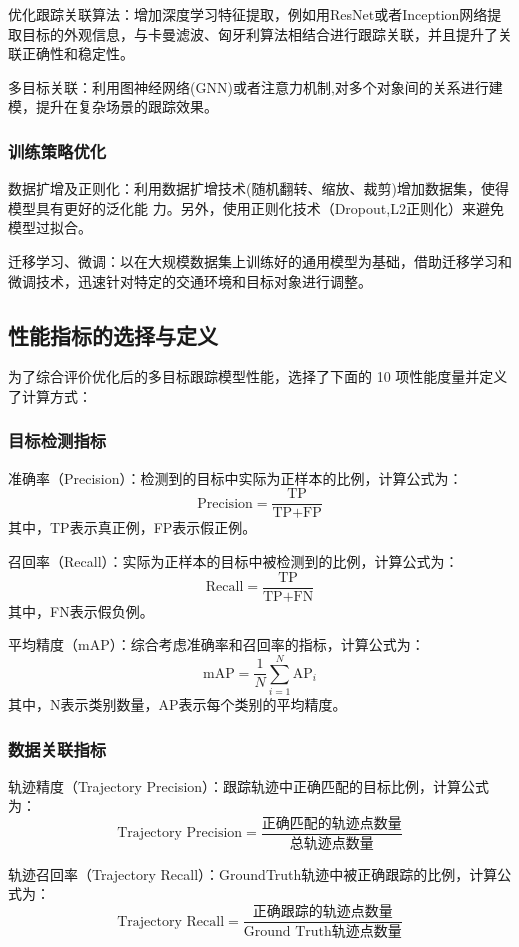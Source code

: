 优化跟踪关联算法：增加深度学习特征提取，例如用ResNet或者Inception网络提取目标的外观信息，与卡曼滤波、匈牙利算法相结合进行跟踪关联，并且提升了关联正确性和稳定性。

多目标关联：利用图神经网络(GNN)或者注意力机制,对多个对象间的关系进行建模，提升在复杂场景的跟踪效果。

\subsubsection{训练策略优化}

数据扩增及正则化：利用数据扩增技术(随机翻转、缩放、裁剪)增加数据集，使得模型具有更好的泛化能   力。另外，使用正则化技术（Dropout,L2正则化）来避免模型过拟合。

迁移学习、微调：以在大规模数据集上训练好的通用模型为基础，借助迁移学习和微调技术，迅速针对特定的交通环境和目标对象进行调整。


\subsection{性能指标的选择与定义}

为了综合评价优化后的多目标跟踪模型性能，选择了下面的 10 项性能度量并定义了计算方式：

\subsubsection{目标检测指标}
准确率（Precision）：检测到的目标中实际为正样本的比例，计算公式为：
\[\text{Precision} = \frac{\text{TP}}{\text{TP} + \text{FP}}\]
其中，TP表示真正例，FP表示假正例。

召回率（Recall）：实际为正样本的目标中被检测到的比例，计算公式为：
\[\text{Recall} = \frac{\text{TP}}{\text{TP} + \text{FN}}\]
其中，FN表示假负例。

平均精度（mAP）：综合考虑准确率和召回率的指标，计算公式为：
\[\text{mAP} = \frac{1}{N} \sum_{i=1}^{N} \text{AP}_i\]
其中，N表示类别数量，AP表示每个类别的平均精度。

\subsubsection{数据关联指标}
轨迹精度（Trajectory Precision）：跟踪轨迹中正确匹配的目标比例，计算公式为：
\[\text{Trajectory Precision} = \frac{\text{正确匹配的轨迹点数量}}{\text{总轨迹点数量}}\]

轨迹召回率（Trajectory Recall）：GroundTruth轨迹中被正确跟踪的比例，计算公式为：
\[\text{Trajectory Recall} = \frac{\text{正确跟踪的轨迹点数量}}{\text{Ground Truth轨迹点数量}}\]

